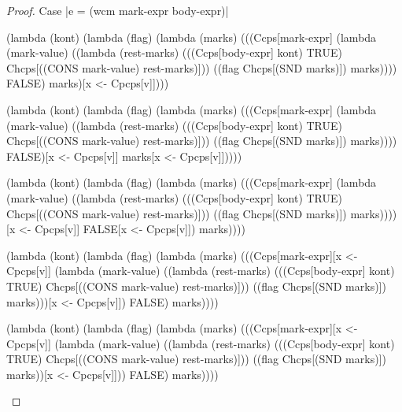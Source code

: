 \begin{proof}{Case \scheme|e = (wcm mark-expr body-expr)|}
\begin{schemeblock}
\begin{schemedisplay}
(lambda (kont)
  (lambda (flag)
    (lambda (marks)
      (((Ccps[mark-expr]
          (lambda (mark-value) 
            ((lambda (rest-marks) 
               (((Ccps[body-expr] kont) TRUE) Chcps[((CONS mark-value) rest-marks)]))
             ((flag Chcps[(SND marks)]) marks))))
        FALSE) marks)[x <- Cpcps[v]])))
\end{schemedisplay}
\end{schemeblock}

\begin{schemeblock}
\begin{schemedisplay}
(lambda (kont)
  (lambda (flag)
    (lambda (marks)
      (((Ccps[mark-expr]
          (lambda (mark-value) 
            ((lambda (rest-marks) 
               (((Ccps[body-expr] kont) TRUE) Chcps[((CONS mark-value) rest-marks)]))
             ((flag Chcps[(SND marks)]) marks))))
        FALSE)[x <- Cpcps[v]] marks[x <- Cpcps[v]]))))
\end{schemedisplay}
\end{schemeblock}

\begin{schemeblock}
\begin{schemedisplay}
(lambda (kont)
  (lambda (flag)
    (lambda (marks)
      (((Ccps[mark-expr]
          (lambda (mark-value) 
            ((lambda (rest-marks) 
               (((Ccps[body-expr] kont) TRUE) Chcps[((CONS mark-value) rest-marks)]))
             ((flag Chcps[(SND marks)]) marks))))[x <- Cpcps[v]]
        FALSE[x <- Cpcps[v]]) marks))))
\end{schemedisplay}
\end{schemeblock}

\begin{schemeblock}
\begin{schemedisplay}
(lambda (kont)
  (lambda (flag)
    (lambda (marks)
      (((Ccps[mark-expr][x <- Cpcps[v]]
          (lambda (mark-value) 
            ((lambda (rest-marks) 
               (((Ccps[body-expr] kont) TRUE) Chcps[((CONS mark-value) rest-marks)]))
             ((flag Chcps[(SND marks)]) marks)))[x <- Cpcps[v]])
        FALSE) marks))))
\end{schemedisplay}
\end{schemeblock}

\begin{schemeblock}
\begin{schemedisplay}
(lambda (kont)
  (lambda (flag)
    (lambda (marks)
      (((Ccps[mark-expr][x <- Cpcps[v]]
          (lambda (mark-value) 
            ((lambda (rest-marks) 
               (((Ccps[body-expr] kont) TRUE) Chcps[((CONS mark-value) rest-marks)]))
             ((flag Chcps[(SND marks)]) marks))[x <- Cpcps[v]]))
        FALSE) marks))))
\end{schemedisplay}
\end{schemeblock}


\end{proof}
